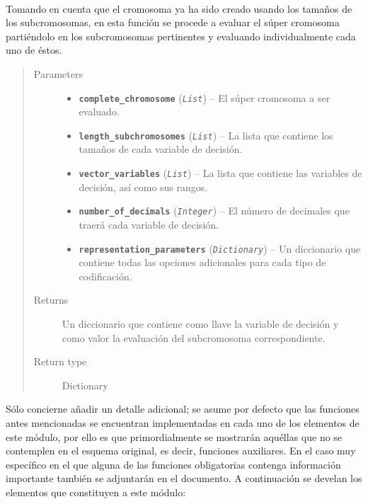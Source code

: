 \documentclass[class=report, crop=false]{standalone}
\begin{document}
\begin{fulllineitems}
~
\vspace{-0.1cm}

Tomando en cuenta que el cromosoma ya ha sido creado usando 
los tamaños de los subcromosomas, en esta función se procede 
a evaluar el súper cromosoma partiéndolo en los subcromosomas 
pertinentes y evaluando individualmente cada uno de éstos.

\begin{quote}\begin{description}
\item[{Parameters}] \leavevmode\begin{itemize}
\item \textbf{\texttt{complete\_chromosome}} (\emph{\texttt{List}}) -- El súper cromosoma a ser evaluado.
\item \textbf{\texttt{length\_subchromosomes}} (\emph{\texttt{List}}) -- La lista que contiene los tamaños de cada variable de decisión.
\item \textbf{\texttt{vector\_variables}} (\emph{\texttt{List}}) -- La lista que contiene las variables de decisión, así como sus rangos.
\item \textbf{\texttt{number\_of\_decimals}} (\emph{\texttt{Integer}}) -- El número de decimales que traerá cada variable de decisión.
\item \textbf{\texttt{representation\_parameters}} (\emph{\texttt{Dictionary}}) -- Un diccionario que contiene todas las opciones adicionales para cada tipo de codificación.
\end{itemize}

\item[{Returns}] \leavevmode
Un diccionario que contiene como llave la variable de decisión 
y como valor la evaluación del subcromosoma correspondiente.
\item[{Return type}] \leavevmode
Dictionary
\end{description}\end{quote}

\end{fulllineitems}

Sólo concierne añadir un detalle adicional; se asume por defecto que las
funciones antes mencionadas se encuentran implementadas en cada uno de los
elementos de este módulo, por ello es que primordialmente se mostrarán 
aquéllas que no se contemplen en el esquema original, es decir, funciones 
auxiliares.\break
En el caso muy específico en el que alguna de las funciones obligatorias 
contenga información importante también se adjuntarán en el documento.\medskip\break  
A continuación se develan los elementos que constituyen a 
este módulo:
\end{document}
